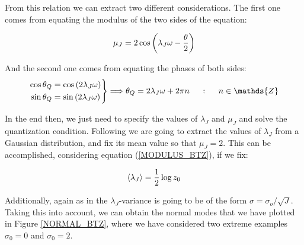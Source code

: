 \documentclass[11pt,a4paper]{article}
\begin{document}
{From this relation we can extract two different considerations. The first one comes from equating the modulus of the two sides of the equation:

\begin{equation}\LA{MODULUS_BTZ}
    \mu_J = 2\cos\left(\lambda_J\w - \frac{\theta}{2}\right)
\end{equation}

{\noindent And the second one comes from equating the phases of both sides:}
\begin{equation}
    \left.\begin{aligned}
        \cos{\theta_Q} &= \cos{\left(2\lambda_J\w\right)}\\
        \sin{\theta_Q} &= \sin{\left(2\lambda_J\w\right)}
    \end{aligned}\right\}\Longrightarrow \theta_Q = 2\lambda_J\omega +2\pi n ~~~~:~~~~ n\in\mathds{Z}
\end{equation}

In the end then, we just need to specify the values of $\lambda_J$ and $\mu_J$ and solve the quantization condition. Following \cite{Jeong_2025,Das_2023,das2023fuzzballsrandommatrices} we are going to extract the values of $\lambda_J$ from a Gaussian distribution, and fix its mean value so that $\mu_J=2$. This can be accomplished, considering equation (\ref{MODULUS_BTZ}), if we fix:

\begin{equation}
    \langle\lambda_J\rangle = \frac{1}{2}\log z_0
\end{equation}

{\noindent Additionally, again as in \cite{Jeong_2025,Das_2023,das2023fuzzballsrandommatrices} the $\lambda_J$-variance is going to be of the form $\sigma = \sigma_o/\sqrt{J}$. Taking this into account, we can obtain the normal modes that we have plotted in Figure \ref{NORMAL_BTZ}, where we have considered two extreme examples $\sigma_0=0$ and $\sigma_0=2$}.

}
\end{document}
